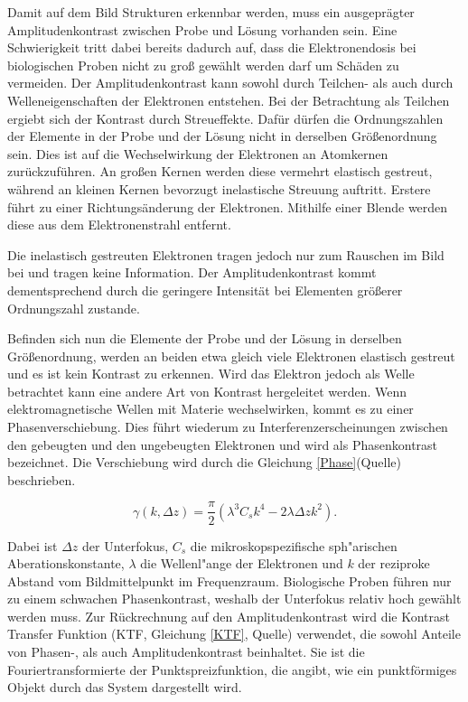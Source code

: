 Damit auf dem Bild Strukturen erkennbar werden, muss ein ausgeprägter Amplitudenkontrast zwischen Probe und Lösung vorhanden sein.
Eine Schwierigkeit tritt dabei bereits dadurch auf, dass die Elektronendosis bei biologischen Proben nicht zu groß gewählt werden darf um Schäden zu vermeiden.
Der Amplitudenkontrast kann sowohl durch Teilchen- als auch durch Welleneigenschaften der Elektronen entstehen. 
Bei der Betrachtung als Teilchen ergiebt sich der Kontrast durch Streueffekte.
Dafür dürfen die Ordnungszahlen der Elemente in der Probe und der Lösung nicht in derselben Größenordnung sein.
Dies ist auf die Wechselwirkung der Elektronen an Atomkernen zurückzuführen.
An großen Kernen werden diese vermehrt elastisch gestreut, während an kleinen Kernen bevorzugt inelastische Streuung auftritt.
Erstere führt zu einer Richtungsänderung der Elektronen.
Mithilfe einer Blende werden diese aus dem Elektronenstrahl entfernt.

Die inelastisch gestreuten Elektronen tragen jedoch nur zum Rauschen im Bild bei und tragen keine Information.
Der Amplitudenkontrast kommt dementsprechend durch die geringere Intensität bei Elementen größerer Ordnungszahl zustande.

Befinden sich nun die Elemente der Probe und der Lösung in derselben Größenordnung, werden an beiden etwa gleich viele Elektronen elastisch gestreut und es ist kein Kontrast zu erkennen.
Wird das Elektron jedoch als Welle betrachtet kann eine andere Art von Kontrast hergeleitet werden.
Wenn elektromagnetische Wellen mit Materie wechselwirken, kommt es zu einer Phasenverschiebung.
Dies führt wiederum zu Interferenzerscheinungen zwischen den gebeugten und den ungebeugten Elektronen und wird als Phasenkontrast bezeichnet.
Die Verschiebung wird durch die Gleichung \eqref{Phase}(Quelle) beschrieben.

\begin{equation}
	\gamma(k,\Delta z) = \frac{\pi}{2}\left(\lambda^3 C_s k^4 - 2\lambda \Delta z k^2\right). \label{Phase}
\end{equation}

Dabei ist $\Delta z$ der Unterfokus, $C_s$ die mikroskopspezifische sph"arischen Aberationskonstante, $\lambda$ die Wellenl"ange der Elektronen und $k$ der reziproke Abstand vom Bildmittelpunkt im Frequenzraum.
Biologische Proben führen nur zu einem schwachen Phasenkontrast, weshalb der Unterfokus relativ hoch gewählt werden muss.
Zur Rückrechnung auf den Amplitudenkontrast wird die Kontrast Transfer Funktion (KTF, Gleichung \eqref{KTF}, Quelle) verwendet, die sowohl Anteile von Phasen-, als auch Amplitudenkontrast beinhaltet.
Sie ist die Fouriertransformierte der Punktspreizfunktion, die angibt, wie ein punktförmiges Objekt durch das System dargestellt wird.

